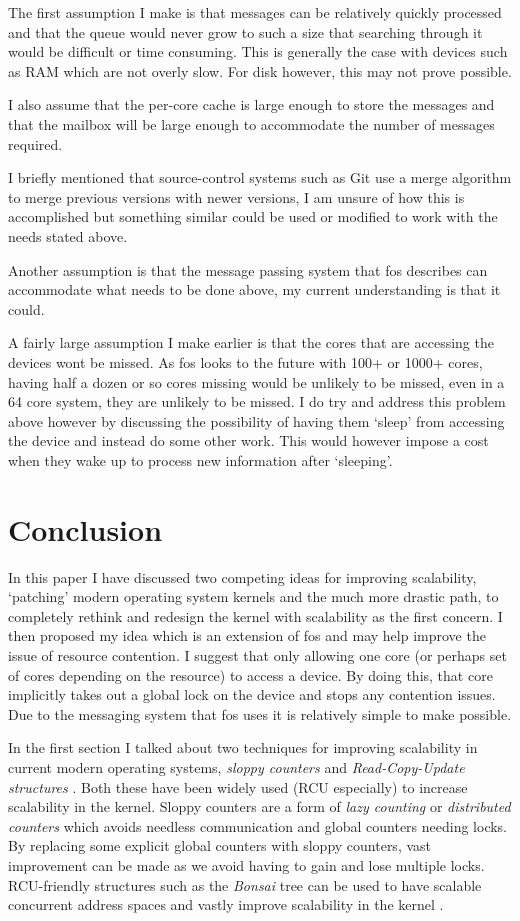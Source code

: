 \documentclass[journal]{IEEEtran}
\begin{document}
The first assumption I make is that messages can be relatively quickly processed and that the queue would never grow to such a size that searching through it would be difficult or time consuming. This is generally the case with devices such as RAM which are not overly slow. For disk however, this may not prove possible. 

I also assume that the per-core cache is large enough to store the messages and that the mailbox will be large enough to accommodate the number of messages required.

I briefly mentioned that source-control systems such as Git use a merge algorithm to merge previous versions with newer versions, I am unsure of how this is accomplished but something similar could be used or modified to work with the needs stated above.

Another assumption is that the message passing system that fos describes can accommodate what needs to be done above, my current understanding is that it could. 

A fairly large assumption I make earlier is that the cores that are accessing the devices wont be missed. As fos looks to the future with 100+ or 1000+ cores, having half a dozen or so cores missing would be unlikely to be missed, even in a 64 core system, they are unlikely to be missed. I do try and address this problem above however by discussing the possibility of having them `sleep' from accessing the device and instead do some other work. This would however impose a cost when they wake up to process new information after `sleeping'.

\section{Conclusion}

In this paper I have discussed two competing ideas for improving scalability, `patching' modern operating system kernels and the much more drastic path, to completely rethink and redesign the kernel with scalability as the first concern. I then proposed my idea which is an extension of fos \cite{fos} and may help improve the issue of resource contention. I suggest that only allowing one core (or perhaps set of cores depending on the resource) to access a device. By doing this, that core implicitly takes out a global lock on the device and stops any contention issues. Due to the messaging system that fos uses it is relatively simple to make possible.

In the first section I talked about two techniques for improving scalability in current modern operating systems, \emph{sloppy counters} \cite{sloppy-counters} and \emph{Read-Copy-Update structures} \cite{RCU}. Both these have been widely used (RCU especially) to increase scalability in the kernel. Sloppy counters are a form of \emph{lazy counting} or \emph{distributed counters} which avoids needless communication and global counters needing locks. By replacing some explicit global counters with sloppy counters, vast improvement can be made as we avoid having to gain and lose multiple locks. RCU-friendly structures such as the \emph{Bonsai} tree can be used to have scalable concurrent address spaces and vastly improve scalability in the kernel \cite{Bonsai}.
\end{document}
